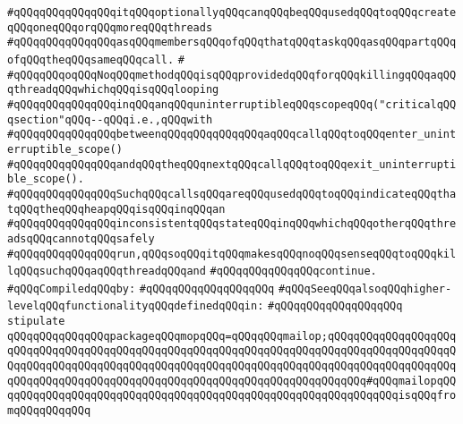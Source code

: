 \verb|#qQQqqQQqqQQqqQQqitqQQqoptionallyqQQqcanqQQqbeqQQqusedqQQqtoqQQqcreateqQQqoneqQQqorqQQqmoreqQQqthreads|\newline
\verb|#qQQqqQQqqQQqqQQqasqQQqmembersqQQqofqQQqthatqQQqtaskqQQqasqQQqpartqQQqofqQQqtheqQQqsameqQQqcall.|\newline
\verb|#|\newline
\verb|#qQQqqQQqoqQQqNoqQQqmethodqQQqisqQQqprovidedqQQqforqQQqkillingqQQqaqQQqthreadqQQqwhichqQQqisqQQqlooping|\newline
\verb|#qQQqqQQqqQQqqQQqinqQQqanqQQquninterruptibleqQQqscopeqQQq("criticalqQQqsection"qQQq--qQQqi.e.,qQQqwith|\newline
\verb|#qQQqqQQqqQQqqQQqbetweenqQQqqQQqqQQqqQQqaqQQqcallqQQqtoqQQqenter_uninterruptible_scope()|\newline
\verb|#qQQqqQQqqQQqqQQqandqQQqtheqQQqnextqQQqcallqQQqtoqQQqexit_uninterruptible_scope().|\newline
\verb|#qQQqqQQqqQQqqQQqSuchqQQqcallsqQQqareqQQqusedqQQqtoqQQqindicateqQQqthatqQQqtheqQQqheapqQQqisqQQqinqQQqan|\newline
\verb|#qQQqqQQqqQQqqQQqinconsistentqQQqstateqQQqinqQQqwhichqQQqotherqQQqthreadsqQQqcannotqQQqsafely|\newline
\verb|#qQQqqQQqqQQqqQQqrun,qQQqsoqQQqitqQQqmakesqQQqnoqQQqsenseqQQqtoqQQqkillqQQqsuchqQQqaqQQqthreadqQQqand|\newline
\verb|#qQQqqQQqqQQqqQQqcontinue.|\newline
\newline
\verb|#qQQqCompiledqQQqby:|\newline
\verb|#qQQqqQQqqQQqqQQqqQQq|\newline
\newline
\verb|#qQQqSeeqQQqalsoqQQqhigher-levelqQQqfunctionalityqQQqdefinedqQQqin:|\newline
\verb|#qQQqqQQqqQQqqQQqqQQq|\newline
\newline
\verb|stipulate|\newline
\verb|qQQqqQQqqQQqqQQqpackageqQQqmopqQQq=qQQqqQQqmailop;qQQqqQQqqQQqqQQqqQQqqQQqqQQqqQQqqQQqqQQqqQQqqQQqqQQqqQQqqQQqqQQqqQQqqQQqqQQqqQQqqQQqqQQqqQQqqQQqqQQqqQQqqQQqqQQqqQQqqQQqqQQqqQQqqQQqqQQqqQQqqQQqqQQqqQQqqQQqqQQqqQQqqQQqqQQqqQQqqQQqqQQqqQQqqQQqqQQqqQQqqQQqqQQqqQQqqQQq#qQQqmailopqQQqqQQqqQQqqQQqqQQqqQQqqQQqqQQqqQQqqQQqqQQqqQQqqQQqqQQqqQQqqQQqisqQQqfromqQQqqQQqqQQq|\newline
